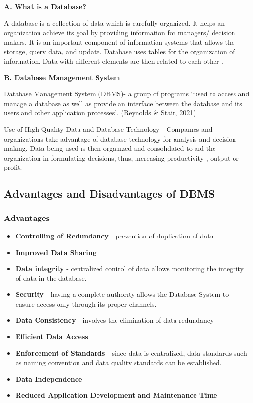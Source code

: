 \documentclass[
  letterpaper,
  DIV=11,
  numbers=noendperiod]{scrreprt}
\providecommand{\tightlist}{%
  \setlength{\itemsep}{0pt}\setlength{\parskip}{0pt}}\usepackage{longtable,booktabs,array}
\begin{document}
\textbf{A. What is a Database?}

A database is a collection of data which is carefully organized. It
helps an organization achieve its goal by providing information for
managers/ decision makers. It is an important component of information
systems that allows the storage, query data, and update. Database uses
tables for the organization of information. Data with different elements
are then related to each other .

\textbf{B. Database Management System}

Database Management System (DBMS)- a group of programs ``used to access
and manage a database as well as provide an interface between the
database and its users and other application processes''. (Reynolds \&
Stair, 2021)

Use of High-Quality Data and Database Technology - Companies and
organizations take advantage of database technology for analysis and
decision-making. Data being used is then organized and consolidated to
aid the organization in formulating decisions, thus, increasing
productivity , output or profit.

\subsection{Advantages and Disadvantages of
DBMS}\label{advantages-and-disadvantages-of-dbms}

\subsubsection{Advantages}\label{advantages}

\begin{itemize}
\tightlist
\item
  \textbf{Controlling of Redundancy} - prevention of duplication of
  data.
\item
  \textbf{Improved Data Sharing}
\item
  \textbf{Data integrity} - centralized control of data allows
  monitoring the integrity of data in the database.
\item
  \textbf{Security} - having a complete authority allows the Database
  System to ensure access only through its proper channels.
\item
  \textbf{Data Consistency} - involves the elimination of data
  redundancy
\item
  \textbf{Efficient Data Access}
\item
  \textbf{Enforcement of Standards} - since data is centralized, data
  standards such as naming convention and data quality standards can be
  established.
\item
  \textbf{Data Independence}
\item
  \textbf{Reduced Application Development and Maintenance Time}
\end{itemize}
\end{document}

